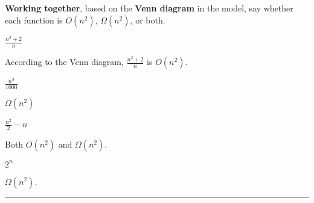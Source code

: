 \documentclass{tufte-handout}
\begin{document}
\begin{questions}
\item \textbf{Working together}, based on the \textbf{Venn diagram} in
  the model, say whether each function is $O(n^2)$, $\Omega(n^2)$, or
  both. 
  \begin{subquestions}
  \item $\frac{n^2 + 2}{n}$
    \begin{answer}According to the Venn diagram, $\frac{n^2 + 2}{n}$ is $O(n^2)$.\end{answer}
  \item $\frac{n^3}{1000}$
    \begin{answer}$\Omega(n^2)$\end{answer}
  \item $\frac{n^2}{2} - n$
    \begin{answer}Both $O(n^2)$ and $\Omega(n^2)$.\end{answer}
  \item $2^n$
    \begin{answer}$\Omega(n^2)$.\end{answer}
  \end{subquestions}
\end{questions}

\hrule \bigskip
\end{document}
